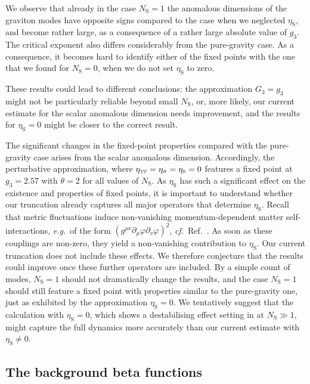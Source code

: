 \documentclass[11pt]{book} %
\newcommand\TTspace{ -1pt }
\newcommand\etaTT{ \eta_{\scriptscriptstyle{\mathrm{T\hspace{\TTspace}T}}} }
\newcommand\etaS{ \eta_{\scriptscriptstyle{\mathrm{S}}} }
\newcommand\NS{ N_{\scriptscriptstyle{\mathrm{S}}} }
\newcommand\eg{\textit{e.g.}\ }
\newcommand\cf{\textit{cf.}\ }
\numberwithin{equation}{chapter}
\begin{document}
We observe that already in the case $\NS=1$
the anomalous dimensions of the graviton modes
have opposite signs compared to the case when we neglected $\etaS$,
and become rather large, as a consequence of a rather large absolute value of $g_3$.
The critical exponent also differs considerably from the pure-gravity case.
As a consequence, it becomes hard to identify either of the fixed points
with the one that we found for $\NS=0$, when we do not set $\etaS$ to zero.

These results could lead to different conclusions:
the approximation $G_3 = g_3$ might not be particularly reliable
beyond small $\NS$, or, more likely, our current estimate
for the scalar anomalous dimension needs improvement,
and the results for $\etaS=0$ might be closer to the correct result.

The significant changes in the fixed-point properties compared with the pure-gravity
case arises from the scalar anomalous dimension.
Accordingly, the perturbative approximation, where $\etaTT=\eta_{\sigma}=\etaS=0$
features a fixed point at $g_3=2.57$ with $\theta=2$ for all values of $\NS$.
As $\etaS$ has such a significant effect on the existence and properties of fixed points,
it is important to understand whether our truncation already captures all major operators
that determine $\etaS$.
Recall that metric fluctuations induce non-vanishing momentum-dependent
matter self-interactions, \eg of the form
$\left(g^{\mu \nu} \partial_{\mu} \varphi \partial_{\nu}\varphi\right)^2$,
\cf Ref.~\cite{Eichhorn:2012va}. As soon as these couplings
are non-zero, they yield a non-vanishing contribution to $\etaS$.
Our current truncation does not include these effects.
We therefore conjecture that the results could improve once these further operators are included.
By a simple count of modes, $\NS=1$ should not dramatically change the results, and the case $\NS=1$
should still feature a fixed point with properties similar to the pure-gravity one,
just as exhibited by the approximation $\etaS=0$.
We tentatively suggest that the calculation with $\etaS=0$,
which shows a destabilising effect setting in at $\NS\gg1$,
might capture the full dynamics more accurately than our current estimate with $\etaS \neq 0$.


\subsection{The background beta functions}
\end{document}
